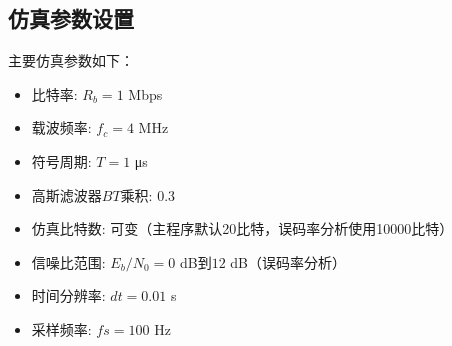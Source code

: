 \documentclass[12pt,a4paper,twoside]{article}
\numberwithin{equation}{section}
\begin{document}
\subsection{仿真参数设置}
主要仿真参数如下：
\begin{itemize}
    \item 比特率: $R_b = 1$ Mbps
    \item 载波频率: $f_c = 4$ MHz
    \item 符号周期: $T = 1$ μs
    \item 高斯滤波器$BT$乘积: 0.3
    \item 仿真比特数: 可变（主程序默认20比特，误码率分析使用10000比特）
    \item 信噪比范围: $E_b/N_0 = 0$ dB到$12$ dB（误码率分析）
    \item 时间分辨率: $dt = 0.01$ s
    \item 采样频率: $fs = 100$ Hz
\end{itemize}
\end{document}
